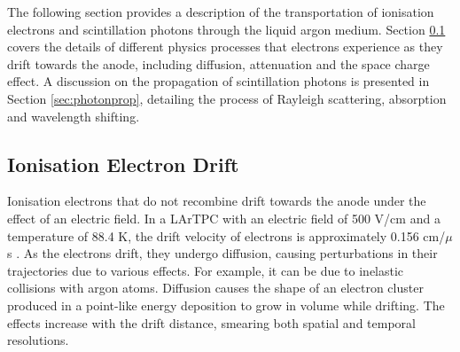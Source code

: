 The following section provides a description of the transportation of ionisation electrons and scintillation photons through the liquid argon medium.
Section \ref{sec:edrift} covers the details of different physics processes that electrons experience as they drift towards the anode, including diffusion, attenuation and the space charge effect.
A discussion on the propagation of scintillation photons is presented in Section \ref{sec:photonprop}, detailing the process of Rayleigh scattering, absorption and wavelength shifting.

\subsection{Ionisation Electron Drift}
\label{sec:edrift}


Ionisation electrons that do not recombine drift towards the anode under the effect of an electric field.
In a LArTPC with an electric field of 500 V/cm and a temperature of 88.4 K, the drift velocity of electrons is approximately 0.156 cm/$\mu$s \cite{drift_vel}.
As the electrons drift, they undergo diffusion, causing perturbations in their trajectories due to various effects.
For example, it can be due to inelastic collisions with argon atoms.
Diffusion causes the shape of an electron cluster produced in a point-like energy deposition to grow in volume while drifting.
The effects increase with the drift distance, smearing both spatial and temporal resolutions. 

